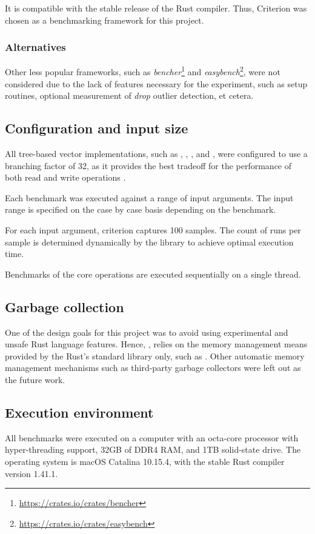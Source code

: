 It is compatible with the stable release of the Rust compiler. Thus, Criterion was chosen as a benchmarking framework for this project.

\subsubsection*{Alternatives}
Other less popular frameworks, such as \emph{bencher}\footnote{\url{https://crates.io/crates/bencher}} and \emph{easybench}\footnote{\url{https://crates.io/crates/easybench}}, were not considered due to the lack of features necessary for the experiment, such as setup routines, optional measurement of \emph{drop} outlier detection, et cetera.

\subsection{Configuration and input size}
All tree-based vector implementations, such as \rbvec{}, \rrbvec{}, \pvec{}, and \imrsvec{}, were configured to use a branching factor of 32, as it provides the best tradeoff for the performance of both read and write operations \cite{efficient-immutable-vectors}.

Each benchmark was executed against a range of input arguments. The input range is specified on the case by case basis depending on the benchmark.

For each input argument, criterion captures 100 samples. The count of runs per sample is determined dynamically by the library to achieve optimal execution time.

Benchmarks of the core operations are executed sequentially on a single thread.

\subsection{Garbage collection}
One of the design goals for this project was to avoid using experimental and unsafe Rust language features. Hence, \pvecrs{}, relies on the memory management means provided by the Rust's standard library only, such as \rc{}. Other automatic memory management mechanisms such as third-party garbage collectors were left out as the future work.

\subsection{Execution environment}
All benchmarks were executed on a computer with an octa-core processor with hyper-threading support, 32GB of DDR4 RAM, and 1TB solid-state drive. The operating system is macOS Catalina 10.15.4, with the stable Rust compiler version 1.41.1.

